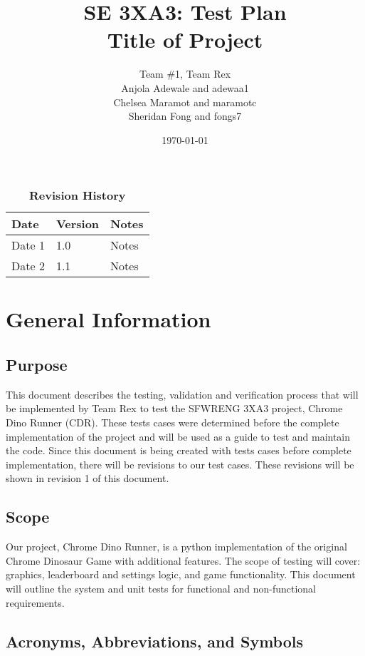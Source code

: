 \documentclass[12pt, titlepage]{article}
\title{SE 3XA3: Test Plan\\Title of Project}
\author{Team \#1, Team Rex
	\\ Anjola Adewale and adewaa1
	\\ Chelsea Maramot and maramotc
	\\ Sheridan Fong and fongs7
}
\date{\today}
\begin{document}
\maketitle

\tableofcontents
\listoftables
\listoffigures

\begin{table}[bp]
\caption{\bf Revision History}
\begin{tabularx}{\textwidth}{p{3cm}p{2cm}X}
\toprule {\bf Date} & {\bf Version} & {\bf Notes}\\
\midrule
Date 1 & 1.0 & Notes\\
Date 2 & 1.1 & Notes\\
\bottomrule
\end{tabularx}
\end{table}

\newpage



\section{General Information}

\subsection{Purpose}
This document describes the testing, validation and verification process that will be implemented by Team Rex to test the SFWRENG 3XA3 project, Chrome Dino Runner (CDR). These tests cases were determined before the complete implementation of the project and will be used as a guide to test and maintain the code. Since this document is being created with tests cases before complete implementation, there will be revisions to our test cases. These revisions will be shown in revision 1 of this document. 

\subsection{Scope}
Our project, Chrome Dino Runner, is a python implementation of the original Chrome Dinosaur Game with additional features. The scope of testing will cover: graphics, leaderboard and settings logic, and game functionality. This document will outline the system and unit tests for functional and non-functional requirements. 


\subsection{Acronyms, Abbreviations, and Symbols}
	
\end{document}
